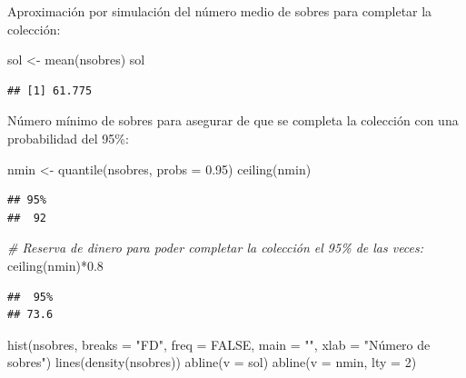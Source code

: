 \documentclass[
]{book}
\newenvironment{Shaded}{\begin{snugshade}}{\end{snugshade}}
\newcommand{\AttributeTok}[1]{\textcolor[rgb]{0.77,0.63,0.00}{#1}}
\newcommand{\CommentTok}[1]{\textcolor[rgb]{0.56,0.35,0.01}{\textit{#1}}}
\newcommand{\ConstantTok}[1]{\textcolor[rgb]{0.00,0.00,0.00}{#1}}
\newcommand{\DecValTok}[1]{\textcolor[rgb]{0.00,0.00,0.81}{#1}}
\newcommand{\FloatTok}[1]{\textcolor[rgb]{0.00,0.00,0.81}{#1}}
\newcommand{\FunctionTok}[1]{\textcolor[rgb]{0.00,0.00,0.00}{#1}}
\newcommand{\NormalTok}[1]{#1}
\newcommand{\OtherTok}[1]{\textcolor[rgb]{0.56,0.35,0.01}{#1}}
\newcommand{\SpecialCharTok}[1]{\textcolor[rgb]{0.00,0.00,0.00}{#1}}
\newcommand{\StringTok}[1]{\textcolor[rgb]{0.31,0.60,0.02}{#1}}
\theoremstyle{break}
\theoremstyle{nonumberplain}
\begin{document}
Aproximación por simulación del número medio de sobres para completar la colección:

\begin{Shaded}
\begin{Highlighting}[]
\NormalTok{sol }\OtherTok{\textless{}{-}} \FunctionTok{mean}\NormalTok{(nsobres)}
\NormalTok{sol}
\end{Highlighting}
\end{Shaded}

\begin{verbatim}
## [1] 61.775
\end{verbatim}

Número mínimo de sobres para asegurar de que se completa la colección con una probabilidad del 95\%:

\begin{Shaded}
\begin{Highlighting}[]
\NormalTok{nmin }\OtherTok{\textless{}{-}} \FunctionTok{quantile}\NormalTok{(nsobres, }\AttributeTok{probs =} \FloatTok{0.95}\NormalTok{)}
\FunctionTok{ceiling}\NormalTok{(nmin)}
\end{Highlighting}
\end{Shaded}

\begin{verbatim}
## 95% 
##  92
\end{verbatim}

\begin{Shaded}
\begin{Highlighting}[]
\CommentTok{\# Reserva de dinero para poder completar la colección el 95\% de las veces:}
\FunctionTok{ceiling}\NormalTok{(nmin)}\SpecialCharTok{*}\FloatTok{0.8}
\end{Highlighting}
\end{Shaded}

\begin{verbatim}
##  95% 
## 73.6
\end{verbatim}

\begin{Shaded}
\begin{Highlighting}[]
\FunctionTok{hist}\NormalTok{(nsobres, }\AttributeTok{breaks =} \StringTok{"FD"}\NormalTok{, }\AttributeTok{freq =} \ConstantTok{FALSE}\NormalTok{,}
     \AttributeTok{main =} \StringTok{""}\NormalTok{, }\AttributeTok{xlab =} \StringTok{"Número de sobres"}\NormalTok{)}
\FunctionTok{lines}\NormalTok{(}\FunctionTok{density}\NormalTok{(nsobres))}
\FunctionTok{abline}\NormalTok{(}\AttributeTok{v =}\NormalTok{ sol)}
\FunctionTok{abline}\NormalTok{(}\AttributeTok{v =}\NormalTok{ nmin, }\AttributeTok{lty =} \DecValTok{2}\NormalTok{)}
\end{Highlighting}
\end{Shaded}
\end{document}
